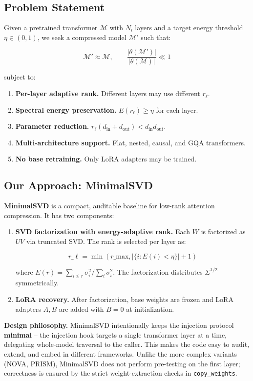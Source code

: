 \subsection{Problem Statement}

Given a pretrained transformer $\mathcal{M}$ with $N_l$ layers and a target 
energy threshold $\eta \in (0, 1)$, we seek a compressed model 
$\mathcal{M}'$ such that:

\[
\mathcal{M}' \approx \mathcal{M}, \qquad
\frac{|\theta(\mathcal{M}')|}{|\theta(\mathcal{M})|} \ll 1
\tag{1.3}
\]

subject to:

\begin{enumerate}
\item \textbf{Per-layer adaptive rank.} Different layers may use different
  $r_\ell$.
\item \textbf{Spectral energy preservation.} $E(r_\ell) \geq \eta$ for each layer.
\item \textbf{Parameter reduction.} $r_\ell(d_\text{in} + d_\text{out}) < d_\text{in} d_\text{out}$.
\item \textbf{Multi-architecture support.} Flat, nested, causal, and GQA transformers.
\item \textbf{No base retraining.} Only LoRA adapters may be trained.

\end{enumerate}
\subsection{Our Approach: MinimalSVD}

\textbf{MinimalSVD} is a compact, auditable baseline for low-rank attention 
compression. It has two components:

\begin{enumerate}
\item \textbf{SVD factorization with energy-adaptive rank.} Each $W$ is factorized as
  $U V$ via truncated SVD. The rank is selected per layer as:

  $$
  r\_\ell = \min\!\left(r\_\text{max}, \left|\{i : E(i) < \eta\}\right| + 1\right)
  \tag{1.4}
  $$

  where $E(r) = \sum_{i \leq r} \sigma_i^2 / \sum_i \sigma_i^2$. The
  factorization distributes $\Sigma^{1/2}$ symmetrically.

\item \textbf{LoRA recovery.} After factorization, base weights are frozen and LoRA
  adapters $A, B$ are added with $B = 0$ at initialization.

\end{enumerate}
\textbf{Design philosophy.} MinimalSVD intentionally keeps the injection protocol 
\textbf{minimal} -- the injection hook targets a single transformer layer at a 
time, delegating whole-model traversal to the caller. This makes the code 
easy to audit, extend, and embed in different frameworks. Unlike the more 
complex variants (NOVA, PRISM), MinimalSVD does not perform pre-testing on 
the first layer; correctness is ensured by the strict weight-extraction 
checks in \texttt{copy\_weights}.

